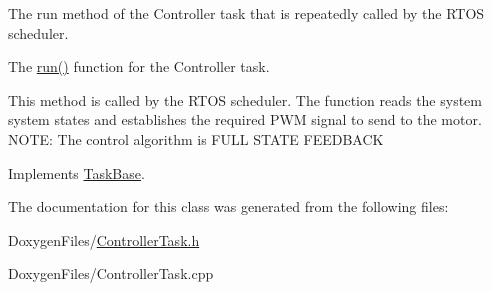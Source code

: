 The run method of the Controller task that is repeatedly called by the R\+T\+OS scheduler. 

The {\ttfamily \mbox{\hyperlink{class_controller_task_adb32c437ea51d258b986414ab48c6180}{run()}}} function for the Controller task.

This method is called by the R\+T\+OS scheduler. The function reads the system system states and establishes the required P\+WM signal to send to the motor. N\+O\+TE\+: The control algorithm is F\+U\+LL S\+T\+A\+TE F\+E\+E\+D\+B\+A\+CK 

Implements \mbox{\hyperlink{class_task_base_adcf6036ad9c860051ccf392ba5e7dbbc}{Task\+Base}}.



The documentation for this class was generated from the following files\+:\begin{DoxyCompactItemize}
\item 
Doxygen\+Files/\mbox{\hyperlink{_controller_task_8h}{Controller\+Task.\+h}}\item 
Doxygen\+Files/Controller\+Task.\+cpp\end{DoxyCompactItemize}
